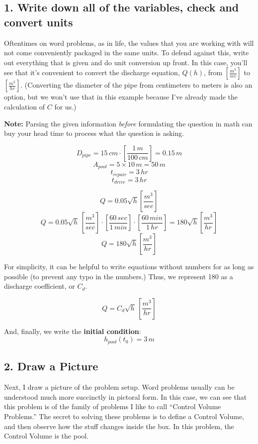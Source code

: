 \documentclass[11pt]{article}
\begin{document}
    \hypertarget{write-down-all-of-the-variables-check-and-convert-units}{%
\subsection{1. Write down all of the variables, check and convert
units}\label{write-down-all-of-the-variables-check-and-convert-units}}

Oftentimes on word problems, as in life, the values that you are working
with will not come conveniently packaged in the same units. To defend
against this, write out everything that is given and do unit conversion
up front. In this case, you'll see that it's convenient to convert the
discharge equation, \(Q(h)\), from \(\left[\frac{m^3}{sec}\right]\) to
\(\left[\frac{m^3}{hr}\right]\). (Converting the diameter of the pipe
from centimeters to meters is also an option, but we won't use that in
this example because I've already made the calculation of \(C\) for us.)

\textbf{Note:} Parsing the given information \emph{before} formulating
the question in math can buy your head time to process what the question
is asking.

\[D_{pipe} = 15 \, cm \cdot \left[\frac{1 \, m}{100 \, cm} \right] = 0.15 \, m\]
\[A_{pool} = 5 \times 10 \, m = 50 \, m\] \[t_{repair} = 3 \, hr\]
\[t_{drive} = 3 \, hr\]

 \[Q = 0.05 \sqrt{h} \left[\frac{m^3}{sec}\right]\]
\[Q = 0.05 \sqrt{h} \, \left[\frac{m^3}{sec}\right] \cdot \left[\frac{60 \, sec}{1 \, min}\right] \cdot \left[\frac{60 \, min}{1 \, hr}\right] = 180 \sqrt{h} \left[\frac{m^3}{hr}\right]\]
\[Q = 180 \sqrt{h} \left[\frac{m^3}{hr}\right]\]

For simplicity, it can be helpful to write equations without numbers for
as long as possible (to prevent any typo in the numbers.) Thus, we
represent 180 as a discharge coefficient, or \(C_d\).

\[Q = C_d \sqrt{h} \, \left[\frac{m^3}{hr}\right]\]

And, finally, we write the \textbf{initial condition}:
\[h_{pool}(t_0) = 3 \, m\]

    \hypertarget{draw-a-picture}{%
\subsection{2. Draw a Picture}\label{draw-a-picture}}

Next, I draw a picture of the problem setup. Word problems usually can
be understood much more succinctly in pictoral form. In this case, we
can see that this problem is of the family of problems I like to call
``Control Volume Problems.'' The secret to solving these problems is to
define a Control Volume, and then observe how the stuff changes inside
the box. In this problem, the Control Volume is the pool.
\end{document}
